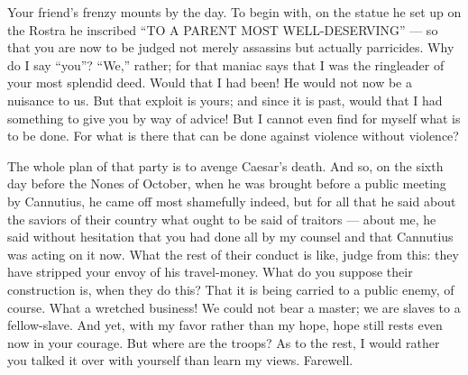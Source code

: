 

 Your friend's frenzy mounts by the day. To begin with, on the statue he set up on the Rostra he inscribed ``TO A PARENT MOST WELL-DESERVING'' --- so that you are now to be judged not merely assassins but actually parricides. Why do I say ``you''? ``We,'' rather; for that maniac says that I was the ringleader of your most splendid deed. Would that I had been! He would not now be a nuisance to us. But that exploit is yours; and since it is past, would that I had something to give you by way of advice! But I cannot even find for myself what is to be done. For what is there that can be done against violence without violence?

 The whole plan of that party is to avenge Caesar's death. And so, on the sixth day before the Nones of October, when he was brought before a public meeting by Cannutius, he came off most shamefully indeed, but for all that he said about the saviors of their country what ought to be said of traitors --- about me, he said without hesitation that you had done all by my counsel and that Cannutius was acting on it now. What the rest of their conduct is like, judge from this: they have stripped your envoy of his travel-money. What do you suppose their construction is, when they do this? That it is being carried to a public enemy, of course. What a wretched business! We could not bear a master; we are slaves to a fellow-slave. And yet, with my favor rather than my hope, hope still rests even now in your courage. But where are the troops? As to the rest, I would rather you talked it over with yourself than learn my views. Farewell.
